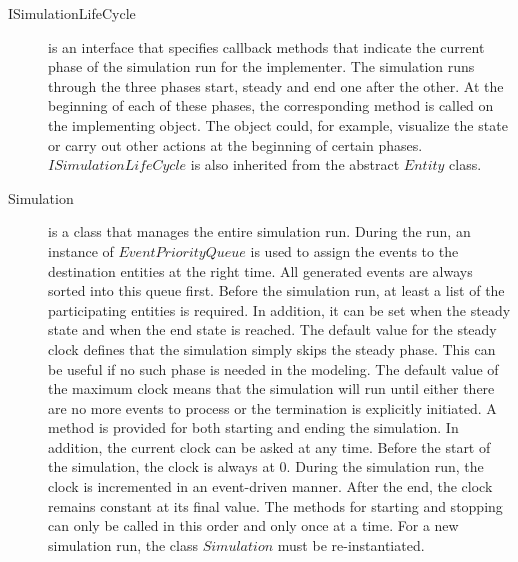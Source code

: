 \documentclass[english,version-2019-11]{uzl-thesis}
\begin{document}
\begin{description}
\item [ISimulationLifeCycle]
is an interface that specifies callback methods that indicate the current phase of the simulation run for the implementer. The simulation runs through the three phases start, steady and end one after the other. At the beginning of each of these phases, the corresponding method is called on the implementing object. The object could, for example, visualize the state or carry out other actions at the beginning of certain phases. $ISimulationLifeCycle$ is also inherited from the abstract $Entity$ class.
\item [Simulation]
is a class that manages the entire simulation run. During the run, an instance of $EventPriorityQueue$ is used to assign the events to the destination entities at the right time. All generated events are always sorted into this queue first.
Before the simulation run, at least a list of the participating entities is required. In addition, it can be set when the steady state and when the end state is reached. The default value for the steady clock defines that the simulation simply skips the steady phase. This can be useful if no such phase is needed in the modeling. The default value of the maximum clock means that the simulation will run until either there are no more events to process or the termination is explicitly initiated.
A method is provided for both starting and ending the simulation. In addition, the current clock can be asked at any time. Before the start of the simulation, the clock is always at $0$. During the simulation run, the clock is incremented in an event-driven manner. After the end, the clock remains constant at its final value. The methods for starting and stopping can only be called in this order and only once at a time. For a new simulation run, the class $Simulation$ must be re-instantiated.
\end{description}
\end{document}
